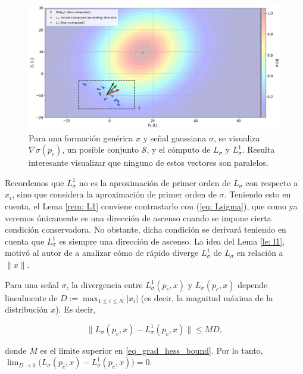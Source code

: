 \begin{figure}[!h]
\centering
\includegraphics[trim={0 0cm 0 0cm}, clip, width=0.8\columnwidth]{./fig/lemma_1.png}
\caption{Para una formación genérica $x$ y señal gaussiana $\sigma$, se visualiza $\nabla\sigma(p_c)$, un posible conjunto $\mathcal{S}$, y el cómputo de $L_\sigma$ y $L_\sigma^1$. Resulta interesante visualizar que ninguno de estos vectores son paralelos. }
\label{fig: ss_lemma1}
\end{figure}

\newpage

Recordemos que $L^1_\sigma$ no es la aproximación de primer orden de $L_\sigma$ con respecto a $x_i$, sino que considera la aproximación de primer orden de $\sigma$. Teniendo esto en cuenta, el Lema \ref{rem: L1} conviene contrastarlo con (\ref{eq: Lsigma}), que como ya veremos únicamente es una dirección de ascenso cuando se impone cierta condición conservadora. No obstante, dicha condición se derivará teniendo en cuenta que $L^1_\sigma$ es siempre una dirección de ascenso. La idea del Lema \ref{le: l1}, motivó al autor de \cite{tfg_antonio} a analizar cómo de rápido diverge $L^1_\sigma$ de $L_\sigma$ en relación a $\|x\|$. 

\vspace{0.5cm}

\begin{lemma} \label{lem: ll1}
Para una señal $\sigma$, la divergencia entre $L^1_\sigma(p_c,x)$ y $L_\sigma(p_c,x)$ depende linealmente de $D := \max_{1 \le i \le N} | x_i |$ (es decir, la magnitud máxima de la distribución $x$). Es decir,

\begin{equation}
\|L_\sigma(p_c,x) - L^1_\sigma(p_c,x)\| \leq MD,\nonumber
\end{equation}

donde $M$ es el límite superior en \eqref{eq_grad_hess_bound}. Por lo tanto, $\lim_{D \to 0} \big( L_\sigma(p_c,x) - L^1_\sigma(p_c,x) \big) = 0$.
\end{lemma}

